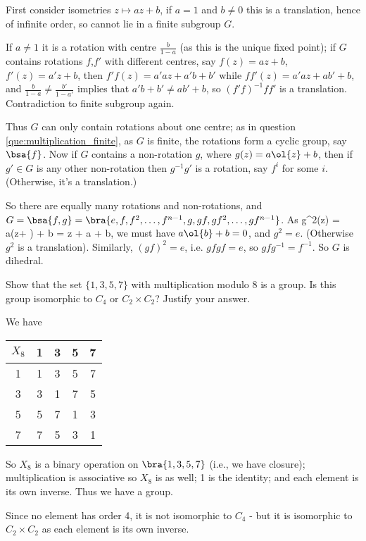 \begin{solution}[\bf Solution.]
First consider isometries $z\mapsto az + b$, if $a=1$ and $b\neq 0$ this is a translation, hence of infinite order, so cannot lie in a finite subgroup $G$. 

If $a\neq 1$ it is a rotation with centre $\frac b{1-a}$ (as this is the unique fixed point); if $G$ contains rotations $f$,$f'$ with different centres, say $f(z) = az + b$, $f'(z) = a'z + b$, then $f'f(z) = a'a z + a'b + b'$ while $ff'(z) = a'a z + ab' + b$, and $\frac b{1-a} \neq \frac {b'}{1-a'}$ implies that $a'b + b' \neq ab' + b$, so $(f'f)^{-1}ff'$ is a translation. Contradiction to finite subgroup again. 

Thus $G$ can only contain rotations about one centre; as in question \ref{que:multiplication_finite}, as $G$ is finite, the rotations form a cyclic group, say $\bsa{f}$. Now if $G$ contains a non-rotation $g$, where $g(z) = a\ol{z} + b$, then if $g'\in G$ is any other non-rotation then $g^{-1}g'$ is a rotation, say $f^i$ for some $i$. (Otherwise, it's a translation.)

So there are equally many rotations and non-rotations, and $G = \bsa{f,g} = \bra{e,f,f^2,\dots,f^{n-1}, g, gf,gf^2 ,\dots, gf^{n-1}}$. As 
\be
g^2(z) = a(z+ ) + b = z + a  + b,
\ee
we must have $a\ol{b} + b = 0$, and $g^2 = e$. (Otherwise $g^2$ is a translation). Similarly, $(gf)^2 = e$, i.e. $gf gf = e$, so $gfg^{-1} = f^{-1}$. So $G$ is dihedral.
\end{solution}


\begin{problem}
Show that the set $\{1, 3, 5, 7\}$ with multiplication modulo 8 is a group. Is this group isomorphic to $C_4$ or $C_2 \times C_2$? Justify your answer.
\end{problem}

\begin{solution}[\bf Solution.]
We have
\begin{center}
\begin{tabular}{c|cccc}
$X_8$ & 1 & 3 & 5 & 7\\
\hline
1 & 1 & 3 & 5 & 7\\
3 & 3 & 1 & 7 & 5\\
5 & 5 & 7 & 1 & 3\\
7 & 7 & 5 & 3 & 1
\end{tabular}
\end{center}

So $X_8$ is a binary operation on $\bra{1,3,5,7}$ (i.e., we have closure); multiplication is associative so $X_8$ is as well; 1 is the identity; and each element is its own inverse. Thus we have a group. 

Since no element has order 4, it is not isomorphic to $C_4$ - but it is isomorphic to $C_2 \times C_2$ as each element is its own inverse.
\end{solution}

